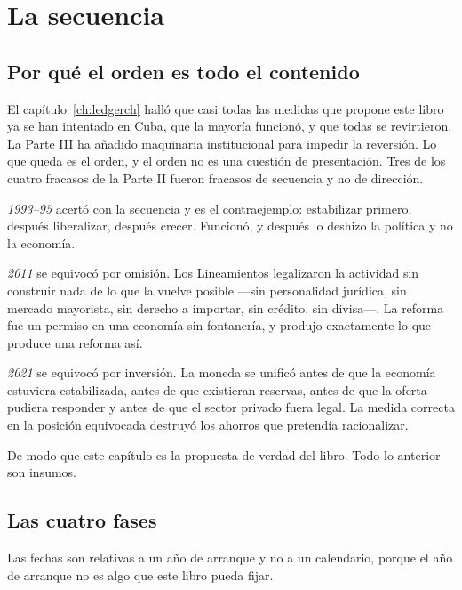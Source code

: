 \chapter{La secuencia}
\label{ch:sequence}

\section{Por qué el orden es todo el contenido}

El capítulo~\ref{ch:ledgerch} halló que casi todas las medidas que propone este libro ya se han
intentado en Cuba, que la mayoría funcionó, y que todas se revirtieron. La Parte III ha añadido
maquinaria institucional para impedir la reversión. Lo que queda es el orden, y el orden no es una
cuestión de presentación. Tres de los cuatro fracasos de la Parte II fueron fracasos de secuencia y
no de dirección.

\emph{1993--95} acertó con la secuencia y es el contraejemplo: estabilizar primero, después
liberalizar, después crecer. Funcionó, y después lo deshizo la política y no la economía.

\emph{2011} se equivocó por omisión. Los Lineamientos legalizaron la actividad sin construir nada de
lo que la vuelve posible ---sin personalidad jurídica, sin mercado mayorista, sin derecho a
importar, sin crédito, sin divisa---. La reforma fue un permiso en una economía sin fontanería, y
produjo exactamente lo que produce una reforma así.

\emph{2021} se equivocó por inversión. La moneda se unificó antes de que la economía estuviera
estabilizada, antes de que existieran reservas, antes de que la oferta pudiera responder y antes de
que el sector privado fuera legal. La medida correcta en la posición equivocada destruyó los
ahorros que pretendía racionalizar.

De modo que este capítulo es la propuesta de verdad del libro. Todo lo anterior son insumos.

\section{Las cuatro fases}

Las fechas son relativas a un año de arranque y no a un calendario, porque el año de arranque no es
algo que este libro pueda fijar.

